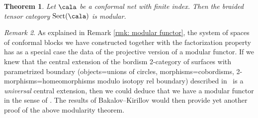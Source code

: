 \documentclass[a4paper,10pt,leqno]{amsart}
\theoremstyle{plain}
\newtheorem{theorem}{Theorem}[section]
\theoremstyle{definition}
\theoremstyle{remark}
\newtheorem{remark}[theorem]{Remark}
\DeclareMathOperator{\Rep}{Sect}
\begin{document}
\begin{theorem}
Let $\cala$ be a conformal net with finite index.
Then the braided tensor category $\Rep(\cala)$ is modular.
\end{theorem}

\begin{remark}\label{rmk: modular functor+}
As explained in Remark \ref{rmk: modular functor}, the system of spaces of conformal blocks we have constructed together with the factorization property has as a special case the data of the projective version of a modular functor.
If we knew that the central extension of the bordism 2-category of surfaces with parametrized boundary (objects=unions of circles, morphisms=cobordisms, 2-morphisms=homeomorphisms modulo isotopy rel boundary) described in~\cite[Def.~5.7.6]{Bakalov-Kirillov(Lect-tens-cat+mod-func)} is a \emph{universal} central extension,
then we could deduce that we have a modular functor in the sense of \cite[Def.~5.7.10]{Bakalov-Kirillov(Lect-tens-cat+mod-func)}.
The results of Bakalov--Kirillov \cite[Thm.~5.7.11]{Bakalov-Kirillov(Lect-tens-cat+mod-func)} would then provide yet another proof of the above modularity theorem.
\end{remark}
\end{document}
